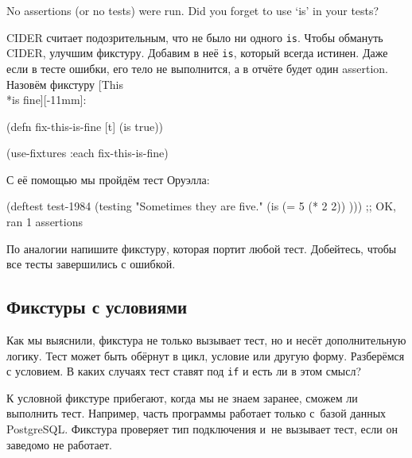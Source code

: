 \begin{english}
  \begin{clojure}
No assertions (or no tests) were run.
Did you forget to use ‘is’ in your tests?
  \end{clojure}
\end{english}


CIDER считает подозрительным, что не было ни одного \verb|is|. Чтобы обмануть
CIDER, улучшим фикстуру. Добавим в неё \verb|is|, который всегда истинен. Даже
если в тесте ошибки, его тело не выполнится, а в отчёте будет один
assertion. Назовём фикстуру [This\\*is fine][-11mm]:

\begin{english}
  \begin{clojure}
(defn fix-this-is-fine [t]
  (is true))

(use-fixtures :each fix-this-is-fine)
  \end{clojure}
\end{english}


С её помощью мы пройдём тест Оруэлла:

\begin{english}
  \begin{clojure}
(deftest test-1984
  (testing "Sometimes they are five."
    (is (= 5 (* 2 2)) )))
;; OK, ran 1 assertions
  \end{clojure}
\end{english}

По аналогии напишите фикстуру, которая портит любой тест. Добейтесь, чтобы все
тесты завершились с ошибкой.

\subsection{Фикстуры с условиями}


Как мы выяснили, фикстура не только вызывает тест, но и несёт дополнительную
логику. Тест может быть обёрнут в цикл, условие или другую форму. Разберёмся с
условием. В каких случаях тест ставят под \verb|if| и есть ли в этом смысл?

К условной фикстуре прибегают, когда мы не знаем заранее, сможем ли выполнить
тест. Например, часть программы работает только с~базой данных
PostgreSQL. Фикстура проверяет тип подключения и~не вызывает тест, если он
заведомо не работает.

